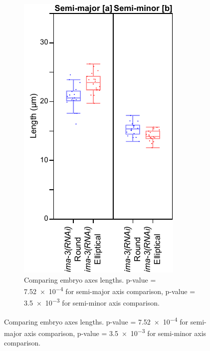 \begin{figure}
\centering
\begin{subfigure}[t]{0.3\textwidth}
    \centering
    \includegraphics[width=\textwidth]{Results/FigIma3RoundElliptical/axesLength.pdf}
    \caption{Comparing embryo axes lengths. p-value = \num{7.52e-4} for semi-major axis comparison, p-value = \num{3.5e-3} for semi-minor axis comparison.} 
    \label{subfig:ima3CompareRoundElliptical-axesLength}
\end{subfigure}

\end{figure}
